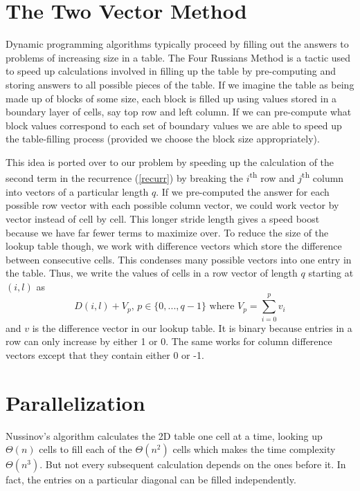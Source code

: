 \documentclass[11pt,a4paper]{article}
\begin{document}
\section{The Two Vector Method}

Dynamic programming algorithms typically proceed by filling out the answers to problems of increasing size in a table. The Four Russians Method is a tactic used to speed up calculations involved in filling up the table by pre-computing and storing answers to all possible pieces of the table. If we imagine the table as being made up of blocks of some size, each block is filled up using values stored in a boundary layer of cells, say top row and left column. If we can pre-compute what block values correspond to each set of boundary values we are able to speed up the table-filling process (provided we choose the block size appropriately).

This idea is ported over to our problem by speeding up the calculation of the second term in the recurrence (\ref{recurr}) by breaking the $i$\textsuperscript{th} row and $j$\textsuperscript{th} column into vectors of a particular length $q$. If we pre-computed the answer for each possible row vector with each possible column vector,  we could work vector by vector instead of cell by cell. This longer stride length gives a speed boost because we have far fewer terms to maximize over. To reduce the size of the lookup table though, we work with difference vectors which store the difference between consecutive cells. This condenses many possible vectors into one entry in the table. Thus, we write the values of cells in a row vector of length $q$ starting at $(i,l)$ as
\[
D(i,l) + V_p\text{, }p\in \lbrace 0,...,q-1\rbrace\text{ where }V_p = \sum\limits_{i=0}^p v_i
\]
and $v$ is the difference vector in our lookup table. It is binary because entries in a row can only increase by either 1 or 0. The same works for column difference vectors except that they contain either 0 or -1.

\section{Parallelization}
Nussinov's algorithm calculates the 2D table one cell at a time, looking up  $\Theta(n)$ cells to fill each of the $\Theta(n^2)$ cells which makes the time complexity $\Theta(n^3)$. But not every subsequent calculation depends on the ones before it. In fact, the entries on a particular diagonal can be filled independently.
\end{document}
